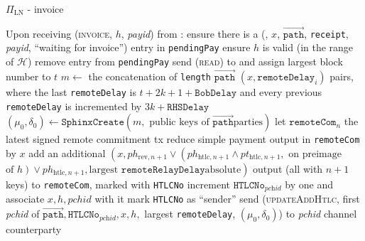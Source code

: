 \begin{protocolbox}{$\Pi_{\mathrm{LN}}$ - invoice}
\begin{algorithmic}[1]
    \State Upon receiving (\textsc{invoice}, $h$, \textit{payid}) from \bob:
    \Indent
      \State ensure there is a (\bob, $x$, $\overrightarrow{\mathtt{path}}$,
      \texttt{receipt}, \textit{payid}, ``waiting for invoice'') entry in
      \texttt{pendingPay}
      \State ensure $h$ is valid (in the range of $\mathcal{H}$)
      \State remove entry from \texttt{pendingPay}
      \State send (\textsc{read}) to \ledger{} and assign largest block number
      to $t$
      \State $m \gets$ the concatenation of \texttt{length}
      $\overrightarrow{\mathtt{path}}$ $\left(x, \mathtt{remoteDelay}_i\right)$
      pairs, where the last \texttt{remoteDelay} is $t + 2k + 1 +
      \mathtt{BobDelay}$ and every previous \texttt{remoteDelay} is incremented
      by $3k + \mathtt{RHSDelay}$ 
      \State $\left(\mu_0, \delta_0\right) \gets \mathtt{SphinxCreate}\left(m,
      \text{ public keys of } \overrightarrow{\mathtt{path}} \text{
      parties}\right)$
      \State let $\mathtt{remoteCom}_n$ the latest signed remote commitment tx
      \State reduce simple payment output in \texttt{remoteCom} by $x$
      \State add an additional $\left(x, ph_{\mathrm{rev}, n+1} \vee
      \left(ph_{\mathrm{htlc}, n+1} \wedge pt_{\mathrm{htlc}, n+1}, \text{ on
      preimage}\right.\right.$ $\left.\left.\text{of } h\right) \vee
      ph_{\mathrm{htlc}, n+1}, \text{largest } \mathtt{remoteRelayDelay} \text{
      absolute}\right)$ output (all with $n+1$ keys) to \texttt{remoteCom},
      marked with \texttt{HTLCNo}
      \State increment $\mathtt{HTLCNo}_{\textit{pchid}}$ by one and associate
      $x, h, \mathit{pchid}$ with it
      \State mark \texttt{HTLCNo} as ``sender''
      \State send (\textsc{updateAddHtlc}, first \textit{pchid} of
      $\overrightarrow{\mathtt{path}}, \mathtt{HTLCNo}_{\textit{pchid}}, x, h,$
      largest \texttt{remoteDelay}, $\left(\mu_0, \delta_0\right)$) to
      \textit{pchid} channel counterparty
    \EndIndent
  \end{algorithmic}
\end{protocolbox}


